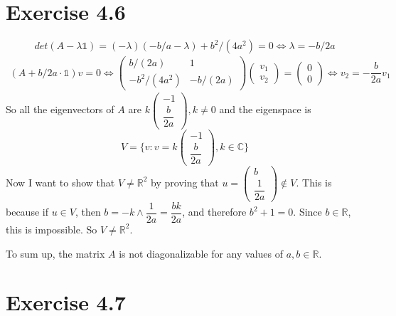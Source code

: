 \documentclass[a4paper,12pt,titlepage]{article}
\begin{document}
\section*{Exercise 4.6}
$$det(A-\lambda \mathds{1})=(-\lambda)(-b/a-\lambda)+b^2/(4a^2)=0\Leftrightarrow \lambda=-b/2a$$
\begin{align*}
(A+b/2a\cdot \mathds{1})v=0\Leftrightarrow
\begin{pmatrix}
b/(2a)&1\\
-b^2/(4a^2)&-b/(2a)
\end{pmatrix}\begin{pmatrix}
v_1\\
v_2
\end{pmatrix}=\begin{pmatrix}
0\\
0
\end{pmatrix}\Leftrightarrow v_2=-\dfrac{b}{2a}v_1
\end{align*}
So all the eigenvectors of $A$ are $k\begin{pmatrix}
-1\\
\dfrac{b}{2a}
\end{pmatrix},k\neq0$ and the eigenspace is $$V=\lbrace v:v=k\begin{pmatrix}
-1\\
\dfrac{b}{2a}
\end{pmatrix},k\in\mathbb{C}\rbrace$$
Now I want to show that $V\neq\mathbb{R}^2$ by proving that $u=\begin{pmatrix}
b\\
\dfrac{1}{2a}
\end{pmatrix}\notin V$.
This is because if $u\in V$, then $b=-k\wedge \dfrac{1}{2a}=\dfrac{bk}{2a}$, and therefore $b^2+1=0$. Since $b\in\mathbb{R}$, this is impossible. So $V\neq\mathbb{R}^2$.

To sum up, the matrix $A$ is not diagonalizable for any values of $a,b\in\mathbb{R}$.

\section*{Exercise 4.7}
\end{document}
